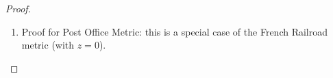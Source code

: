 \begin{proof}
\begin{enumerate}
  \item Proof for Post Office Metric: this is a special case
        of the French Railroad metric (with $z=0$).



\end{enumerate}
\end{proof}


